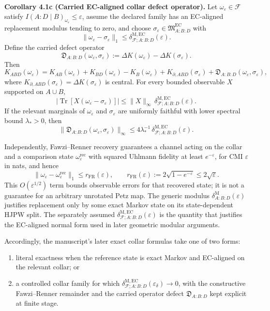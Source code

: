 \textbf{Corollary 4.1c (Carried EC-aligned collar defect operator).} Let \(\omega_\varepsilon\in\mathcal F\) satisfy \(I(A:D\mid B)_{\omega_\varepsilon}\le \varepsilon\), assume the declared family has an EC-aligned replacement modulus tending to zero, and choose \(\sigma_\varepsilon\in\mathfrak M^{\mathrm{EC}}_{A:B:D}\) with
\[
\|\omega_\varepsilon-\sigma_\varepsilon\|_1
\le
\delta^{\mathrm{M,EC}}_{\mathcal F;A:B:D}(\varepsilon).
\]
Define the carried defect operator
\[
\mathfrak D_{A:B:D}(\omega_\varepsilon,\sigma_\varepsilon)
:=
\Delta K(\omega_\varepsilon)-\Delta K(\sigma_\varepsilon).
\]
Then
\[
K_{ABD}(\omega_\varepsilon)
=
K_{AB}(\omega_\varepsilon)+K_{BD}(\omega_\varepsilon)-K_B(\omega_\varepsilon)
+K_{\partial,ABD}(\sigma_\varepsilon)
+\mathfrak D_{A:B:D}(\omega_\varepsilon,\sigma_\varepsilon),
\]
where \(K_{\partial,ABD}(\sigma_\varepsilon)=\Delta K(\sigma_\varepsilon)\) is central. For every bounded observable \(X\) supported on \(A\cup B\),
\[
\left|
\operatorname{Tr}\!\left[X(\omega_\varepsilon-\sigma_\varepsilon)\right]
\right|
\le
\|X\|_\infty\,\delta^{\mathrm{M,EC}}_{\mathcal F;A:B:D}(\varepsilon).
\]
If the relevant marginals of \(\omega_\varepsilon\) and \(\sigma_\varepsilon\) are uniformly faithful with lower spectral bound \(\lambda_\ast>0\), then
\[
\|\mathfrak D_{A:B:D}(\omega_\varepsilon,\sigma_\varepsilon)\|_\infty
\le
4\lambda_\ast^{-1}\,\delta^{\mathrm{M,EC}}_{\mathcal F;A:B:D}(\varepsilon).
\]

Independently, Fawzi--Renner recovery guarantees a channel acting on the collar and a comparison state \(\omega^{\mathrm{rec}}_\varepsilon\) with squared Uhlmann fidelity at least \(e^{-\varepsilon}\), for CMI \(\varepsilon\) in nats, and hence
\[
\|\omega_\varepsilon-\omega^{\mathrm{rec}}_\varepsilon\|_1
\le
r_{\mathrm{FR}}(\varepsilon),
\qquad
r_{\mathrm{FR}}(\varepsilon):=2\sqrt{1-e^{-\varepsilon}}\le 2\sqrt{\varepsilon}.
\]
This \(O(\varepsilon^{1/2})\) term bounds observable errors for that recovered state; it is not a guarantee for an arbitrary unrotated Petz map. The generic modulus \(\delta^{\mathrm M}_{A:B:D}(\varepsilon)\) justifies replacement only by some exact Markov state on its state-dependent HJPW split. The separately assumed \(\delta^{\mathrm{M,EC}}_{\mathcal F;A:B:D}(\varepsilon)\) is the quantity that justifies the EC-aligned normal form used in later geometric modular arguments.

Accordingly, the manuscript's later exact collar formulas take one of two forms:
\begin{enumerate}
\item literal exactness when the reference state is exact Markov and EC-aligned on the relevant collar; or
\item a controlled collar family for which \(\delta^{\mathrm{M,EC}}_{\mathcal F;A:B:D}(\varepsilon_\delta)\to0\), with the constructive Fawzi--Renner remainder and the carried operator defect \(\mathfrak D_{A:B:D}\) kept explicit at finite stage.
\end{enumerate}

